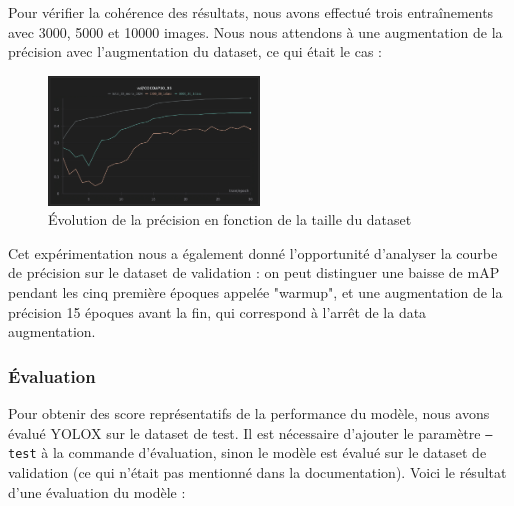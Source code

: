 Pour vérifier la cohérence des résultats, nous avons effectué trois entraînements avec 3000, 5000 
et 10000 images. Nous nous attendons à une augmentation de la précision avec l'augmentation du dataset, 
ce qui était le cas : 

\begin{figure}[H]
    \centering
    \includegraphics[width=0.5\textwidth]{./img/dataset_size.png}
    \caption{Évolution de la précision en fonction de la taille du dataset}
\end{figure}

Cet expérimentation nous a également donné l'opportunité d'analyser la courbe de précision sur le dataset
de validation : on peut distinguer une baisse de mAP pendant les cinq première époques appelée "warmup", 
et une augmentation de la précision 15 époques avant la fin, qui correspond à l'arrêt de la data augmentation.\\

\subsubsection{Évaluation}

Pour obtenir des score représentatifs de la performance du modèle, nous avons évalué YOLOX
sur le dataset de test. Il est nécessaire d'ajouter le paramètre \texttt{--test} à la commande
d'évaluation, sinon le modèle est évalué sur le dataset de validation (ce qui n'était pas mentionné 
dans la documentation). Voici le résultat d'une évaluation du modèle : 

